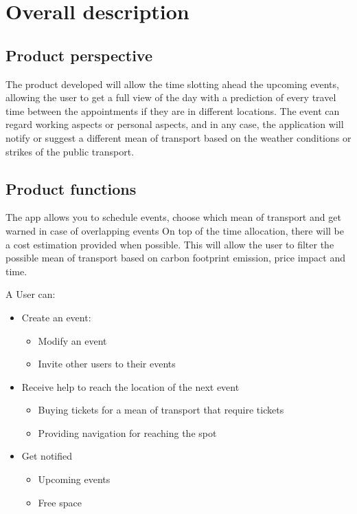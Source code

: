 \chapter{Overall description}
\label{cha:desc}

\section{Product perspective}
\label{sec:productperspective}
The product developed will allow the time slotting ahead the upcoming events, allowing the user to get a full view of the day with a prediction of every travel time between the appointments if they are in different locations.
The event can regard working aspects or personal aspects, and in any case, the application will notify or suggest a different mean of transport based on the weather conditions or strikes of the public transport.


\section{Product functions}
\label{sec:productfunctions}
The app allows you to schedule events, choose which mean of transport and get warned in case of overlapping events
On top of the time allocation, there will be a cost estimation provided when possible. 
This will allow the user to filter the possible mean of transport based on carbon footprint emission, price impact and time.

A User can:
\begin{itemize}
\item Create an event:
\begin{itemize}
\item Modify an event
\item Invite other users to their events
\end{itemize}
\item Receive help to reach the location of the next event
\begin{itemize}
\item Buying tickets for a mean of transport that require tickets
\item Providing navigation for reaching the spot 
\end{itemize}
\end{itemize}
\begin{itemize}
\item Get notified
\begin{itemize}
\item Upcoming events
\item Free space
\end{itemize}
\end{itemize}

